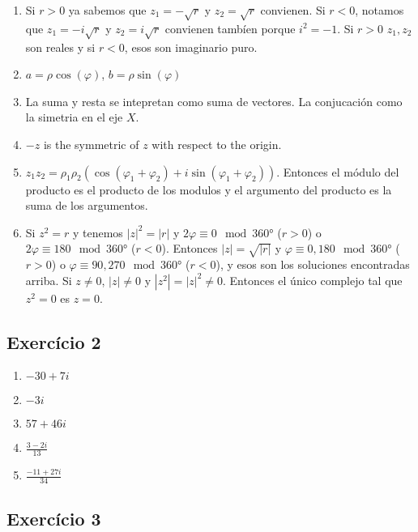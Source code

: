 \begin{enumerate}
\item Si $r > 0$ ya sabemos que $z_1 = -\sqrt{r}$ y $z_2 = \sqrt{r}$ convienen.
  Si $r < 0$, notamos que $z_1 = -i\sqrt{r}$ y $z_2 = i\sqrt{r}$ convienen
  tambíen porque $i^2 = -1$. Si $r > 0$ $z_1,z_2$ son reales y si $r < 0$,
  esos son imaginario puro.
\item $a = \rho {\cos(\varphi)}$, $b = \rho {\sin(\varphi)}$
\item La suma y resta se intepretan como suma de vectores. La conjucación como la simetria en el eje $X$.
\item $-z$ is the symmetric of $z$ with respect to the origin.
\item $z_1 z_2 = {\rho_1 \rho_2} \left({\cos(\varphi_1 + \varphi_2)} + i
  {\sin(\varphi_1 + \varphi_2)} \right)$. Entonces el módulo del producto es el
  producto de los modulos y el argumento del producto es la suma de los argumentos.
\item Si $z^2 = r$ y tenemos ${|z|}^2 = {|r|}$ y $2 \varphi \equiv 0 \mod 360°$ ($r > 0$) o $2 \varphi \equiv 180 \mod 360°$ ($r < 0$).
  Entonces $|z| = \sqrt{|r|}$ y $\varphi \equiv 0, 180 \mod 360°$ ($r > 0$)
  o $\varphi \equiv 90, 270 \mod 360°$ ($r < 0$), y esos son los soluciones
  encontradas arriba. Si $z \neq 0$, ${|z|} \neq 0$ y ${|z^2|} =
  {|z|}^2 \neq 0$. Entonces el único complejo tal que $z^2 = 0$ es $z = 0$.
\end{enumerate}

\subsection*{Exercício 2}

\begin{enumerate}
\item $-30+7i$
\item $-3i$
\item $57+46i$
\item $\frac{3-2i}{13}$
\item $\frac{-11+27i}{34}$
\end{enumerate}

\subsection*{Exercício 3}

